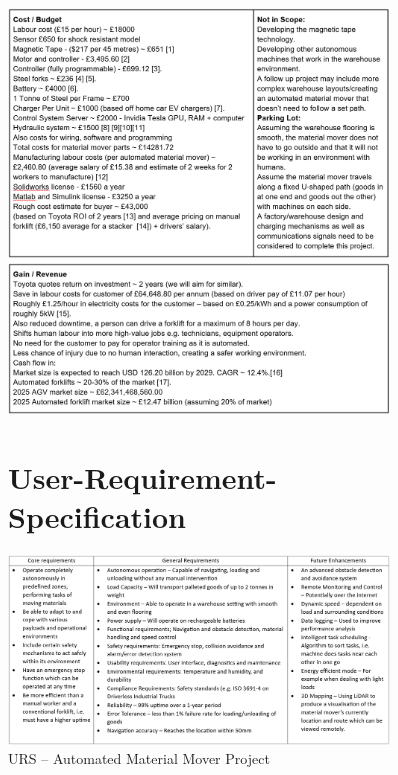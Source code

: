 \documentclass[12pt]{article}
\begin{document}
\begin{figure}[htbp]
    \centering
     \includegraphics[width=0.9\textwidth]{Scope Canvas 3.png}
     \includegraphics[width=0.9\textwidth]{Scope Canvas 4.png}
     \section{User-Requirement-Specification}
     \includegraphics[width=0.9\textwidth]{URS1.png}
     \caption{URS – Automated Material Mover Project}
    \label{fig:URS}
\end{figure}

\FloatBarrier




\end{document}
